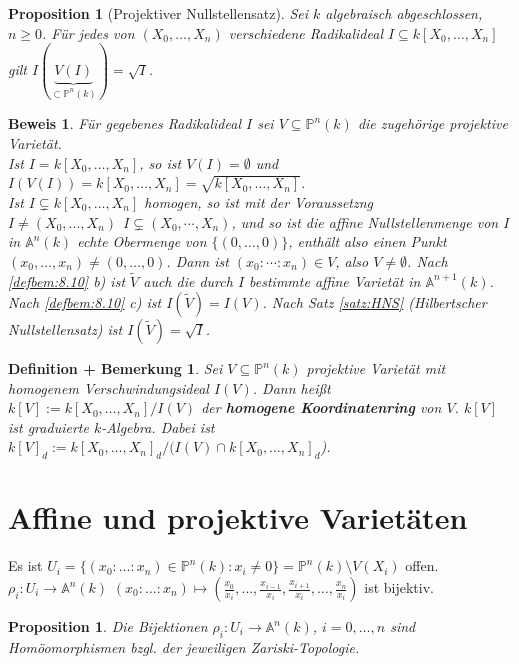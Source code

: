 \documentclass[a4paper,12pt]{report}
\theoremstyle{break}
\newtheorem{DefBem}[Def]{Definition + Bemerkung}
\newtheorem{Prop}[Def]{Proposition}
\theoremstyle{nonumberbreak}
\theoremstyle{nonumberplain}
\newtheorem{Bew}{Beweis}
\newcommand{\emp}[1]{\textbf{\emph{#1}}}
\newcommand{\begriff}[1]{{\index{#1}}\emp{#1}}
\begin{document}
\begin{Prop}[Projektiver Nullstellensatz]
\label{prop:8.9}
 Sei $k$ algebraisch abgeschlossen, $n \ge 0$. Für jedes von $(X_0, \dots, X_n)$ verschiedene Radikalideal $I \subseteq k[X_0,\dots,X_n]$ gilt $I(\underbrace{V(I)}_{\subset \mathbb P^n(k)})=\sqrt{I}$.
\end{Prop}
\begin{Bew}
Für gegebenes Radikalideal $I$ sei $V \subseteq \mathbb P^n(k)$ die zugehörige projektive Varietät.\\
Ist $I = k[X_0, \dots, X_n]$, so ist $V(I) = \emptyset$ und $I(V(I))=k[X_0, \dots, X_n] = \sqrt{k[X_0, \dots, X_n]}$.\\
Ist $I \subsetneq k[X_0, \dots, X_n]$ homogen, so ist mit der Voraussetzng $I\neq(X_0,...,X_n)~~I\subsetneq (X_0,\cdots,X_n)$, und so ist die affine Nullstellenmenge von $I$ in $\mathbb A^n(k)$ echte Obermenge von $\{(0,\dots, 0)\}$, enthält also einen Punkt $(x_0, \dots, x_n) \ne (0, \dots, 0)$. Dann ist $(x_0:\cdots :x_n)\in V$, also $V\ne\emptyset$.
Nach \ref{defbem:8.10} b) ist $\tilde{V}$ auch die durch $I$ bestimmte affine Varietät in $\mathbb A^{n+1}(k)$. Nach \ref{defbem:8.10} c) ist $I(\tilde{V})=I(V)$. Nach Satz \ref{satz:HNS} (Hilbertscher Nullstellensatz) ist $I(\tilde{V})=\sqrt{I}$.  
\end{Bew}
\begin{DefBem}
 \label{defbem:8.11}
Sei $V \subseteq \mathbb P^n(k)$ projektive Varietät mit homogenem Verschwindungsideal $I(V)$. Dann heißt $k[V]:=k[X_0, \dots, X_n]/I(V)$ der \begriff{homogene Koordinatenring} von $V$. $k[V]$ ist graduierte $k$-Algebra. Dabei ist $k[V]_d:=k[X_0, \dots, X_n]_d/(I(V) \cap k[X_0, \dots, X_n]_d$).
\end{DefBem}

\section{Affine und projektive Varietäten}
Es ist $U_i =\{(x_0: \dots: x_n)\in \mathbb P^n(k):x_i \ne 0\}=\mathbb P^n(k) \setminus V(X_i)$ offen.\\
$\rho_i:U_i \rightarrow \mathbb A^n(k)$ $(x_0: \dots: x_n) \mapsto (\frac{x_0}{x_i}, \dots , \frac{x_{i-1}}{x_i},\frac{x_{i+1}}{x_i}, \dots , \frac{x_n}{x_i})$ ist bijektiv.
\begin{Prop}
 \label{prop:9.1}
 Die Bijektionen $\rho_i:U_i \rightarrow \mathbb A^n(k)$, $i = 0, \dots, n$ sind Homöomorphismen bzgl. der jeweiligen Zariski-Topologie.
\end{Prop}
\end{document}
